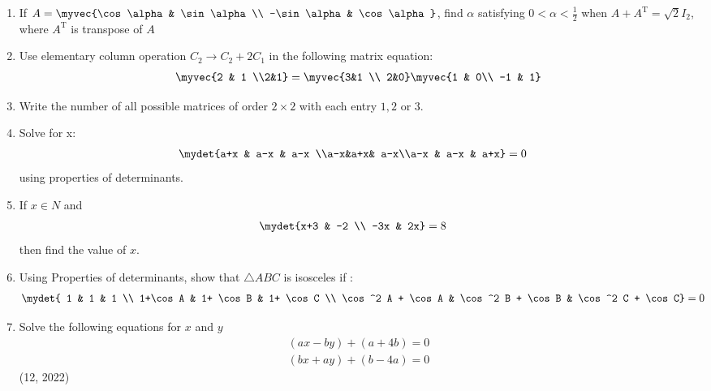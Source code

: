 \begin{enumerate}[label=\thesubsection.\arabic*, ref=\thesubsection.\theenumi]
    \item If $A = \myvec{\cos \alpha & \sin \alpha\\ -\sin \alpha & \cos \alpha}$, find $\alpha$ satisfying $0<\alpha<\frac{1}{2}$ when $A + A^{\text{T}} = \sqrt{2}I_{2}$, where $A^{\text{T}}$ is transpose of $A$
    \item Use elementary column operation $C_2 \rightarrow C_2 + 2C_1$ in the following matrix equation:
          \begin{align*}
              \myvec{2 & 1 \\2&1} = \myvec{3&1 \\ 2&0} \myvec{1 & 0\\ -1 & 1}
          \end{align*}
    \item Write the number of all possible matrices of order $2\times2$ with each entry $1,2$ or $3$.
    \item Solve for x:
          \begin{align*}
              \mydet{a+x & a-x & a-x \\a-x&a+x& a-x\\a-x & a-x & a+x} &=0
          \end{align*}
          using properties of determinants.
    \item If $x \in N$ and
          \begin{align*}
              \mydet{x+3 & -2 \\ -3x & 2x} &= 8
          \end{align*}
          then find the value of $x$.
    \item Using Properties of determinants, show that $\triangle ABC$ is isosceles if :
          \begin{align*}
              \mydet{
              1                 & 1                 & 1                       \\
              1+\cos A          & 1+ \cos B         & 1+ \cos C               \\
              \cos^2 A + \cos A & \cos^2 B + \cos B & \cos^2 C + \cos C} & =0
          \end{align*}
\item Solve the following equations for $x$ and $y$ 
	\begin{align}
		(ax-by)+(a+4b)=0\\
		(bx+ay)+(b-4a)=0
	\end{align}
\hfill (12, 2022)
\end{enumerate}

